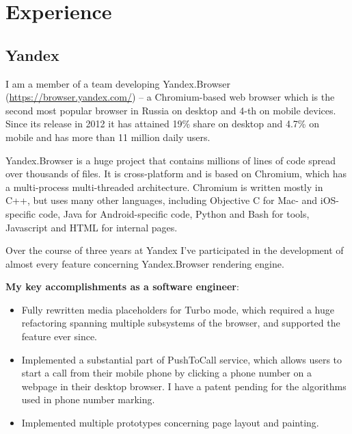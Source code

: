 \documentclass[11pt,a4paper]{moderncv}
\begin{document}
\makecvtitle

\section{Experience}
\subsection{Yandex}
  I am a member of a team developing Yandex.Browser (\url{https://browser.yandex.com/}) -- a Chromium-based web browser which is the second most popular browser in Russia on desktop and 4-th on mobile devices.
  Since its release in 2012 it has attained 19\% share on desktop and 4.7\% on mobile and has more than 11 million daily users.

  Yandex.Browser is a huge project that contains millions of lines of code spread over thousands of files. It is cross-platform and is based on Chromium, which has a multi-process multi-threaded architecture.
  Chromium is written mostly in C++, but uses many other languages, including Objective C for Mac- and iOS-specific code, Java for Android-specific code, Python and Bash for tools, Javascript and HTML for internal pages.

  Over the course of three years at Yandex I've participated in the development of almost every feature concerning Yandex.Browser rendering engine.

  \medskip
  \textbf{My key accomplishments as a software engineer}:
  \smallskip
  \begin{itemize}%
    \item Fully rewritten media placeholders for Turbo mode, which required a huge refactoring spanning multiple subsystems of the browser, and supported the feature ever since.
    \item Implemented a substantial part of PushToCall service, which allows users to start a call from their mobile phone by clicking a phone number on a webpage in their desktop browser.
      I have a patent pending for the algorithms used in phone number marking.
    \item Implemented multiple prototypes concerning page layout and painting.
  \end{itemize}
\end{document}
